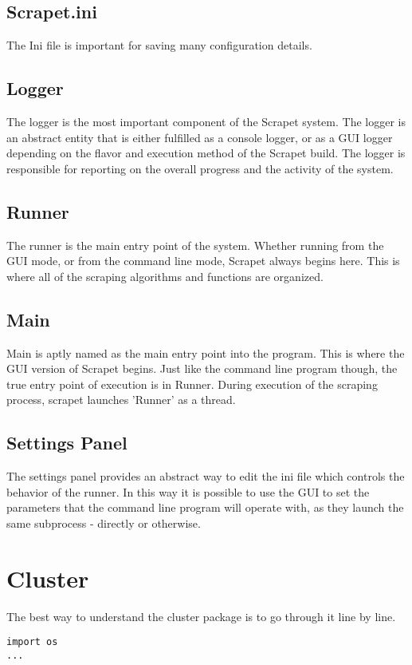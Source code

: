 \subsection{Scrapet.ini}
The Ini file is important for saving many configuration details.

\subsection{Logger}
The logger is the most important component of the Scrapet system. The
logger is an abstract entity that is either fulfilled as a console
logger, or as a GUI logger depending on the flavor and execution
method of the Scrapet build. The logger is responsible for reporting
on the overall progress and the activity of the system.

\subsection{Runner}
The runner is the main entry point of the system. Whether running from
the GUI mode, or from the command line mode, Scrapet always begins
here. This is where all of the scraping algorithms and functions are
organized.

\subsection{Main}
Main is aptly named as the main entry point into the program. This is
where the GUI version of Scrapet begins. Just like the command line
program though, the true entry point of execution is in Runner. During
execution of the scraping process, scrapet launches 'Runner' as a
thread.

\subsection{Settings Panel}
The settings panel provides an abstract way to edit the ini file which
controls the behavior of the runner. In this way it is possible to use
the GUI to set the parameters that the command line program will
operate with, as they launch the same subprocess - directly or
otherwise.

\section{Cluster}
The best way to understand the cluster package is to go through it
line by line.

\begin{lstlisting}
import os
...
\end{lstlisting}
